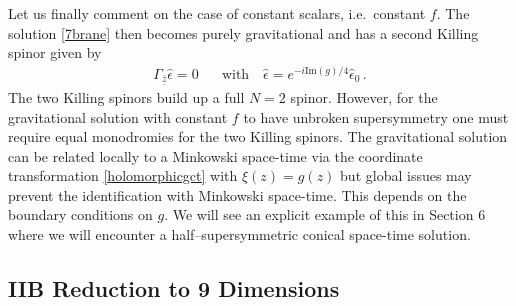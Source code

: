\documentclass[12pt,a4paper]{article}
\begin{document}
Let us finally comment on the case of constant scalars, i.e.~constant $f$.
The solution \eqref{7brane} then becomes purely gravitational
and has a second Killing spinor given by
\begin{align}
  \Gamma_{\overline{\underline{z}}} \hat{\epsilon} = 0 \text{~~~~ with ~~}
    \hat{\epsilon} = e^{-i\text{Im}(g)/4} \hat{\epsilon}_0 \,.
\end{align}
The two Killing spinors build up a full $N=2$ spinor. However, for
the gravitational solution with constant $f$ to have unbroken supersymmetry
one must require equal monodromies for the two Killing spinors.
The gravitational solution can be related locally to a Minkowski space-time via the
coordinate transformation \eqref{holomorphicgct} with $\xi(z)=g(z)$
but global issues may prevent the identification with Minkowski space-time.
This depends on the boundary conditions on $g$. We will see an explicit
example of this in Section 6 where we will encounter a half--supersymmetric 
conical space-time solution.


\subsection{IIB Reduction to 9 Dimensions}
\end{document}
